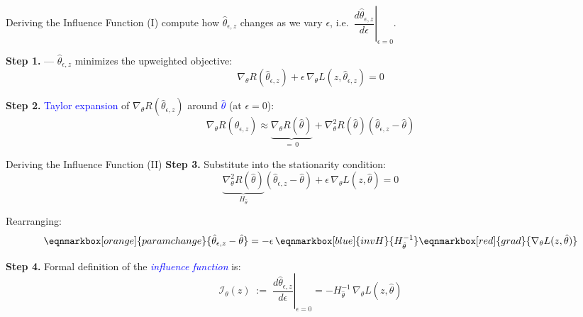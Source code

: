 \documentclass[aspectratio=169]{beamer}
\renewcommand{\emph}[1]{\textit{\textcolor{blue}{#1}}}
\newcommand{\remph}[1]{\textit{\textcolor{red}{#1}}}
\newcommand{\tblue}[1]{\textcolor{blue}{#1}}
\begin{document}
\begin{frame}{Deriving the Influence Function (I)}
    \textbf{\temporal<1>{Goal:}{\remph{Goal:}}{Goal:}} compute how $\hat{\theta}_{\epsilon, z}$ changes as we vary $\epsilon$, i.e.\ $\left.\dfrac{d\hat{\theta}_{\epsilon,z}}{d\epsilon}\right|_{\epsilon=0}$.

    \pause

    \vspace{0.5cm}
    \textbf{Step 1.}  --- $\hat{\theta}_{\epsilon, z}$ minimizes the upweighted objective:
    \begin{equation}
        \nabla_\theta R(\hat{\theta}_{\epsilon,z}) + \epsilon\,\nabla_\theta L(z, \hat{\theta}_{\epsilon,z}) = 0
    \end{equation}

    \pause
    \vspace{0.3cm}
    \textbf{Step 2.} \tblue{Taylor expansion} of $\nabla_\theta R(\hat{\theta}_{\epsilon,z})$ around \tblue{$\hat{\theta}$} (at $\epsilon=0$):
    \[
        \nabla_\theta R(\hat{\theta}_{\epsilon,z}) \approx \underbrace{\nabla_\theta R(\hat{\theta})}_{=\,0} + \nabla_\theta^2 R(\hat{\theta})(\hat{\theta}_{\epsilon,z} - \hat{\theta})
    \]
\end{frame}

\begin{frame}{Deriving the Influence Function (II)}
    \textbf{Step 3.} Substitute into the stationarity condition:
    \[
        \underbrace{\nabla_\theta^2 R(\hat{\theta})}_{H_{\hat{\theta}}} (\hat{\theta}_{\epsilon,z} - \hat{\theta}) + \epsilon\,\nabla_\theta L(z, \hat{\theta}) = 0
    \]

    \pause
    
    Rearranging:
    \[
        \eqnmarkbox[orange]{paramchange}{\hat{\theta}_{\epsilon,z} - \hat{\theta}} = -\epsilon\, \eqnmarkbox[blue]{invH}{H_{\hat{\theta}}^{-1}} \eqnmarkbox[red]{grad}{\nabla_\theta L(z, \hat{\theta})}
    \]

    \pause
    \vspace{0.5cm}
    \textbf{Step 4.} Formal definition of the \emph{influence function} is:
    \[
        \mathcal{I}_\theta(z) \;:=\; \left.\frac{d\hat{\theta}_{\epsilon,z}}{d\epsilon}\right|_{\epsilon=0} = -H_{\hat{\theta}}^{-1}\,\nabla_\theta L(z, \hat{\theta})
    \]
\end{frame}
\end{document}
